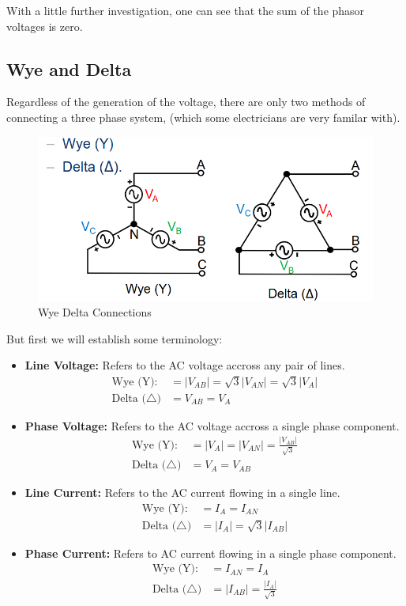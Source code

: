 \documentclass{book}
\begin{document}
With a little further investigation, one can see that the sum of the phasor voltages is zero. 

\subsection{Wye and Delta}

Regardless of the generation of the voltage, there are only two methods of connecting a three phase system, (which some electricians are very familar with).

\begin{figure}[h]
	\centering
	\includegraphics[width=0.4\linewidth]{Screenshots/wye_delta}
	\caption{Wye Delta Connections}
	\label{fig:wyedelta}
\end{figure}

But first we will establish some terminology:

\begin{itemize}
	\item \textbf{Line Voltage:} Refers to the AC voltage accross any pair of lines. 
	\begin{align*}
		\text{Wye (Y):} &= |V_{AB}|= \sqrt{3} |V_{AN}| =\sqrt{3} |V_A| \\
		\text{Delta ($\bigtriangleup$)} &= V_{AB} = V_A
	\end{align*}
	\item \textbf{Phase Voltage:} Refers to the AC voltage accross a single phase component.
	\begin{align*}
		\text{Wye (Y):} &= |V_A| = |V_{AN}| = \frac{|V_{AB}|}{\sqrt{3}}\\
		\text{Delta ($\bigtriangleup$)} &=  V_A = V_{AB} 
	\end{align*}
	\item \textbf{Line Current:} Refers to the AC current flowing in a single line.
	\begin{align*}
		\text{Wye (Y):} &= I_A = I_{AN} \\
		\text{Delta ($\bigtriangleup$)} &= |I_A| = \sqrt{3}|I_{AB}|  
	\end{align*}
	\item \textbf{Phase Current:} Refers to AC current flowing in a single phase component.
	\begin{align*}
		\text{Wye (Y):} &= I_{AN} = I_A \\
		\text{Delta ($\bigtriangleup$)} &=  |I_{AB}| = \frac{|I_A|}{\sqrt{3}}
	\end{align*}
\end{itemize}
\end{document}
